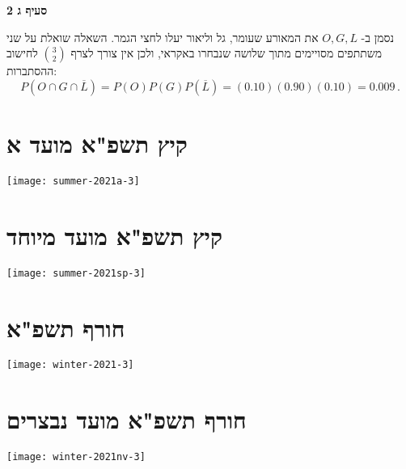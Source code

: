 \textbf{סעיף ג 2}

נסמן ב-%
$O,G,L$
את המאורע שעומר, גל וליאור יעלו לחצי הגמר. השאלה שואלת על שני משתתפים מסויימים מתוך שלושה שנבחרו באקראי, ולכן אין צורך לצרף
${3\choose 2}$
לחישוב ההסתברות:
\[
P(O\cap G \cap \overline{L}) = P(O)P(G)P(\overline{L}) =
\left(0.10\right)\left(0.90\right)\left(0.10\right)=0.009\,.
\]


\newpage

\section{קיץ תשפ"א מועד א}

\begin{center}
\texttt{[image: summer-2021a-3]}
\end{center}


\section{קיץ תשפ"א מועד מיוחד}

\begin{center}
\texttt{[image: summer-2021sp-3]}
\end{center}


\section{חורף תשפ"א}

\begin{center}
\texttt{[image: winter-2021-3]}
\end{center}


\section{חורף תשפ"א מועד נבצרים}

\begin{center}
\texttt{[image: winter-2021nv-3]}
\end{center}
